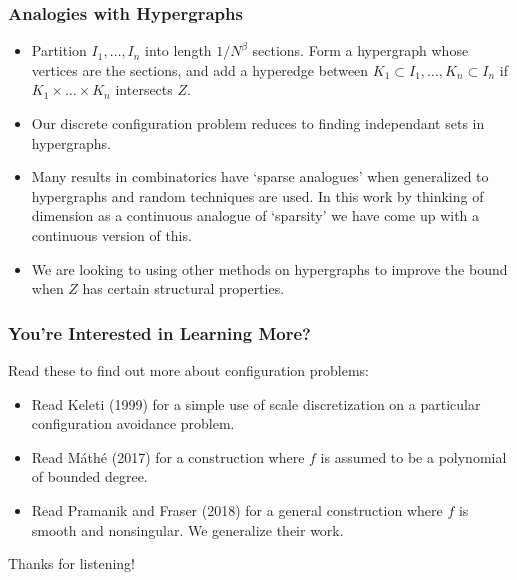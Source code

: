 \documentclass[usenames,dvipsnames]{beamer}
\begin{document}
\begin{frame}
    \frametitle{Analogies with Hypergraphs}

    \begin{itemize}
        \item Partition $I_1, \dots, I_n$ into length $1/N^\beta$ sections. Form a hypergraph whose vertices are the sections, and add a hyperedge between $K_1 \subset I_1, \dots, K_n \subset I_n$ if $K_1 \times \dots \times K_n$ intersects $Z$.

        \item Our discrete configuration problem reduces to finding independant sets in hypergraphs.

        \item Many results in combinatorics have `sparse analogues' when generalized to hypergraphs and random techniques are used. In this work by thinking of dimension as a continuous analogue of `sparsity' we have come up with a continuous version of this.

        \item We are looking to using other methods on hypergraphs to improve the bound when $Z$ has certain structural properties.
    \end{itemize}
\end{frame}

\begin{frame}
    \frametitle{You're Interested in Learning More?}

Read these to find out more about configuration problems:

    \begin{itemize}
            \item Read Keleti (1999) for a simple use of scale discretization on a particular configuration avoidance problem.
            \item Read M\'{a}th\'{e} (2017) for a construction where $f$ is assumed to be a polynomial of bounded degree.
            \item Read Pramanik and Fraser (2018) for a general construction where $f$ is smooth and nonsingular. We generalize their work.
    \end{itemize}

    Thanks for listening!
\end{frame}
\end{document}
